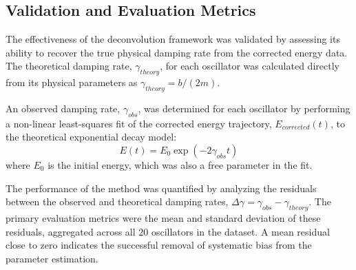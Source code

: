 \documentclass[]{article}
\begin{document}
\subsection{Validation and Evaluation Metrics}
The effectiveness of the deconvolution framework was validated by assessing its ability to recover the true physical damping rate from the corrected energy data. The theoretical damping rate, $\gamma_{theory}$, for each oscillator was calculated directly from its physical parameters as $\gamma_{theory} = b / (2m)$.

An observed damping rate, $\gamma_{obs}$, was determined for each oscillator by performing a non-linear least-squares fit of the corrected energy trajectory, $E_{corrected}(t)$, to the theoretical exponential decay model:
\begin{equation}
E(t) = E_0 \exp(-2\gamma_{obs} t)
\end{equation}
where $E_0$ is the initial energy, which was also a free parameter in the fit.

The performance of the method was quantified by analyzing the residuals between the observed and theoretical damping rates, $\Delta\gamma = \gamma_{obs} - \gamma_{theory}$. The primary evaluation metrics were the mean and standard deviation of these residuals, aggregated across all 20 oscillators in the dataset. A mean residual close to zero indicates the successful removal of systematic bias from the parameter estimation.
\end{document}
